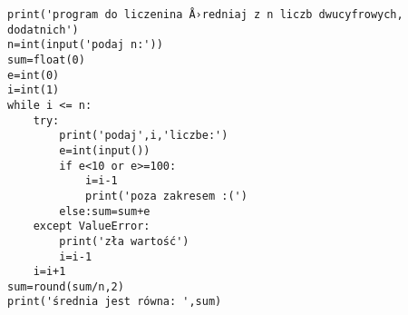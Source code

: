 \begin{verbatim}
print('program do liczenina Å›redniaj z n liczb dwucyfrowych, dodatnich')
n=int(input('podaj n:'))
sum=float(0)
e=int(0)
i=int(1)
while i <= n:
    try:   
        print('podaj',i,'liczbe:')
        e=int(input())
        if e<10 or e>=100: 
            i=i-1
            print('poza zakresem :(')    
        else:sum=sum+e
    except ValueError:
        print('zła wartość')
        i=i-1
    i=i+1
sum=round(sum/n,2)
print('średnia jest równa: ',sum)
\end{verbatim}